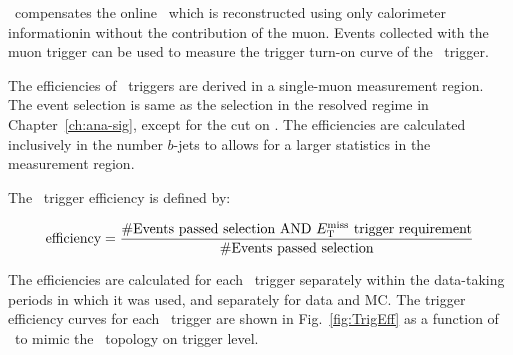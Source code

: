 \par \METnomu~compensates the online \MET~which is reconstructed using only calorimeter informationin without the contribution of the muon.
Events collected with the muon trigger can be used to measure the trigger turn-on curve of the \MET~trigger. 

\par The efficiencies of \MET~triggers are derived in a single-muon measurement region.
The event selection is same as the selection in the resolved regime in Chapter~\ref{ch:ana-sig}, except for the cut on \met.
The efficiencies are calculated inclusively in the number $b$-jets to allows for a larger statistics in the measurement region.

\par The \MET~trigger efficiency is defined by:

\begin{equation}
	\label{eq:trigeff}
	\text{efficiency} = \frac{\text{\#Events passed selection AND \ensuremath{E_{\mathrm{T}}^{\mathrm{miss}}}~trigger requirement}}{\text{\#Events passed selection}}
\end{equation}

\par The efficiencies are calculated for each \MET~trigger separately within the data-taking periods in which it was used, and separately for data and MC.
 The trigger efficiency curves for each \MET~trigger are shown in Fig.~\ref{fig:TrigEff} as a function of \METnomu~to mimic the \MET~topology on trigger level.


